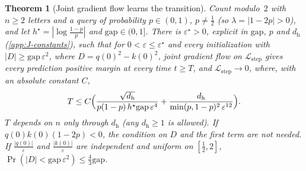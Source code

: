 \documentclass[11pt]{article}
\newtheorem{theorem}{Theorem}
\theoremstyle{definition}
\theoremstyle{remark}
\newcommand{\Lstep}{\mathcal L_{\mathrm{step}}}
\newcommand{\initscale}{\varepsilon}
\newcommand{\mixrate}{\lambda}
\begin{document}
\begin{theorem}[Joint gradient flow learns the transition]
\label{thm:joint}
Count modulo~$2$ with $n\ge2$ letters and a query of probability $p\in(0,1)$, $p\neq\tfrac{1}{2}$ (so $\mixrate=|1-2p|>0$), and let
$h^\star=|\log\tfrac{1-p}{p}|$ and $\mathrm{gap}\in(0,1]$. There is $\initscale^\star>0$, explicit in $\mathrm{gap}$, $p$ and $d_{\mathrm h}$ (\cref{app:J-constants}), such that for
$0<\initscale\le\initscale^\star$ and every initialization with $|D|\ge\mathrm{gap}\,\initscale^2$, where $D=q(0)^2-k(0)^2$, joint gradient flow on $\Lstep$ gives every prediction positive margin at
every time $t\ge T$, and $\Lstep\to0$, where, with an absolute constant $C$,
\[
 T\le C\Bigl(\frac{\sqrt{d_{\mathrm h}}}{p(1-p)\,h^\star\mathrm{gap}\,\initscale^4}+\frac{d_{\mathrm h}}{\min(p,1-p)^2\,\initscale^{12}}\Bigr).
\]
$T$ depends on $n$ only through $d_{\mathrm h}$ (any $d_{\mathrm h}\ge1$ is allowed). If $q(0)k(0)(1-2p)<0$, the condition on $D$ and the
first term are not needed. If $\frac{|q(0)|}{\initscale}$ and $\frac{|k(0)|}{\initscale}$ are independent and uniform on $[\tfrac{1}{2},2]$, $\Pr(|D|<\mathrm{gap}\,\initscale^2)\le\tfrac{4}{3}\mathrm{gap}$.
\end{theorem}





\end{document}
